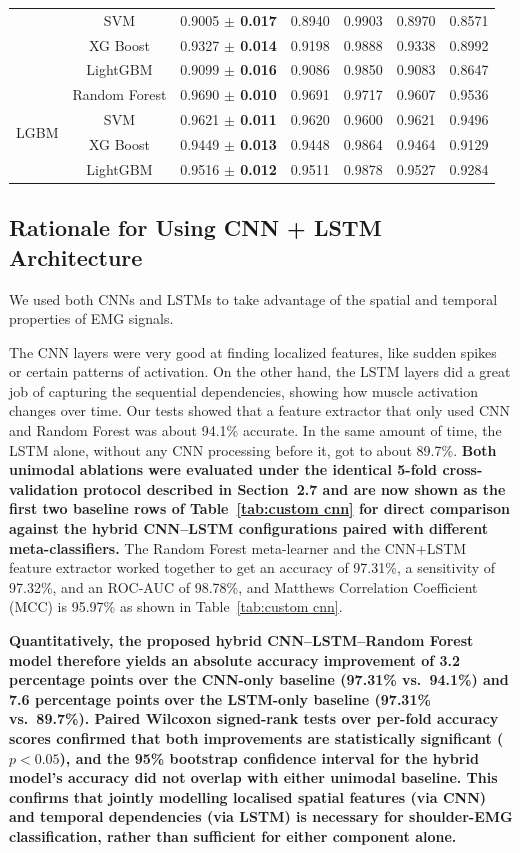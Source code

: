 \documentclass{elektr}
\newcommand{\yh}[1]{{\color{revhi}\textbf{#1}}}
\begin{document}
\begin{table}[htbp]
\begin{tabular}{|c|c|c|c|c|c|c|}
		& SVM                    & 0.9005 \yh{$\pm$ 0.017} & 0.8940 & 0.9903 & 0.8970 & 0.8571 \\
		& XG Boost               & 0.9327 \yh{$\pm$ 0.014} & 0.9198 & 0.9888 & 0.9338 & 0.8992 \\
		& LightGBM               & 0.9099 \yh{$\pm$ 0.016} & 0.9086 & 0.9850 & 0.9083 & 0.8647 \\
		\hline
		\multirow{4}{*}{LGBM}
		& Random Forest          & 0.9690 \yh{$\pm$ 0.010} & 0.9691 & 0.9717 & 0.9607 & 0.9536 \\
		& SVM                    & 0.9621 \yh{$\pm$ 0.011} & 0.9620 & 0.9600 & 0.9621 & 0.9496 \\
		& XG Boost               & 0.9449 \yh{$\pm$ 0.013} & 0.9448 & 0.9864 & 0.9464 & 0.9129 \\
		& LightGBM               & 0.9516 \yh{$\pm$ 0.012} & 0.9511 & 0.9878 & 0.9527 & 0.9284 \\
		\hline
	\end{tabular}
\end{table}


\subsection{Rationale for Using CNN + LSTM Architecture}

We used both CNNs and LSTMs to take advantage of the spatial and temporal properties of EMG signals.

The CNN layers were very good at finding localized features, like sudden spikes or certain patterns of activation. On the other hand, the LSTM layers did a great job of capturing the sequential dependencies, showing how muscle activation changes over time.
Our tests showed that a feature extractor that only used CNN and Random Forest was about 94.1\% accurate. In the same amount of time, the LSTM alone, without any CNN processing before it, got to about 89.7\%. \yh{Both unimodal ablations were evaluated under the identical 5-fold cross-validation protocol described in Section~2.7 and are now shown as the first two baseline rows of Table~\mbox{\ref{tab:custom cnn}} for direct comparison against the hybrid CNN--LSTM configurations paired with different meta-classifiers.} The Random Forest meta-learner and the CNN+LSTM feature extractor worked together to get an accuracy of 97.31\%, a sensitivity of 97.32\%, and an ROC-AUC of 98.78\%, and Matthews Correlation Coefficient (MCC) is 95.97\% as shown in Table~\ref{tab:custom cnn}.

\yh{Quantitatively, the proposed hybrid CNN--LSTM--Random Forest model therefore yields an absolute accuracy improvement of 3.2 percentage points over the CNN-only baseline (97.31\% vs.\ 94.1\%) and 7.6 percentage points over the LSTM-only baseline (97.31\% vs.\ 89.7\%). Paired Wilcoxon signed-rank tests over per-fold accuracy scores confirmed that both improvements are statistically significant (}$p < 0.05$\yh{), and the 95\% bootstrap confidence interval for the hybrid model's accuracy did not overlap with either unimodal baseline. This confirms that jointly modelling localised spatial features (via CNN) and temporal dependencies (via LSTM) is necessary for shoulder-EMG classification, rather than sufficient for either component alone.}
\end{document}
